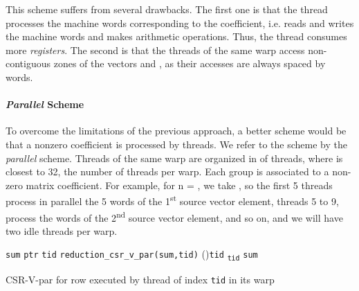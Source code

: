 \documentclass[runningheads,orivec]{llncs}
\begin{document}
This scheme suffers from several drawbacks. The first one is that the thread processes the  machine words corresponding to the coefficient, i.e. reads and writes the  machine words and makes  arithmetic operations. Thus, the thread consumes more \textit{registers}. The second is that the threads of the same warp access non-contiguous zones of the vectors  and , as their accesses are always spaced by  words.

\vspace*{-0.25cm}
\paragraph{\bf \textit{Parallel} Scheme}

To overcome the limitations of the previous approach, a better scheme would be that a nonzero coefficient is processed by  threads. We refer to the scheme by the \textit{parallel} scheme. Threads of the same warp are organized in  of  threads, where  is closest to 32, the number of threads per warp. Each group is associated to a non-zero matrix coefficient. For example, for n = , we take , so the first 5 threads process in parallel the 5 words of the 1\textsuperscript{st} source vector element, threads 5 to 9, process the words of the 2\textsuperscript{nd} source vector element, and so on, and we will have two idle threads per warp.



\begin{algorithm}[H]
 \small 
 \BlankLine
 \texttt{sum} 
  \texttt{ptr}\textsubscript{}  \texttt{tid}  
   \texttt{reduction\_csr\_v\_par(sum,tid)}\;
  \If(){\texttt{\upshape tid}}{
  	\textsubscript{  \texttt{tid}}  \texttt{sum}\;
  } 
 \caption{\small CSR-V-par for row  executed by thread of index \texttt{tid} in its warp}
 \label{algo::csr vector-parallel}
\end{algorithm}
\end{document}
